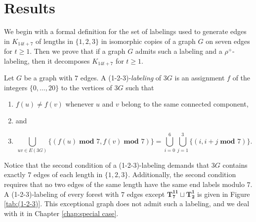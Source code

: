 \section{Results}\label{sec:7,8result}
We begin with a formal definition for the set of labelings used to generate edges in $K_{14t+7}$ of lengths in $\{1,2,3\}$ in isomorphic copies of a graph $G$ on seven edges for $t\geq 1$. Then we prove that if a graph $G$ admits such a labeling and a $\rho^{+}$-labeling, then it decomposes $K_{14t+7}$ for $t\geq 1$.
\begin{definition}\label{def:1-2-3}
    Let $G$ be a graph with $7$ edges. A (1-2-3)-\emph{labeling} of $3G$ is an assignment $f$ of the integers $\{0,\dots,20\}$ to the vertices of $3G$ such that
    \begin{enumerate}
        \item $f(u) \neq f(v)$ whenever $u$ and $v$ belong to the same connected component,
        \item[] and
        \item $$\bigcup_{uv\in E(3G)} \{(f(u)\; \textbf{mod } 7,f(v)\; \textbf{mod } 7)\}= \bigcup_{i=0}^{6} \bigcup_{j=1}^{3} \{(i,i+j \; \textbf{mod } 7)\}.$$
    \end{enumerate}

\end{definition}
Notice that the second condition of a (1-2-3)-labeling demands that $3G$ contains exactly $7$ edges of each length in $\{1,2,3\}$. Additionally, the second condition requires that no two edges of the same length have the same end labels modulo $7$. A (1-2-3)-labeling of every forest with $7$ edges except $\mathbf{T_{7}^{11}}\sqcup\mathbf{T_{2}^{1}}$ is given in Figure \ref{tab:(1-2-3)}. This exceptional graph does not admit such a labeling, and we deal with it in Chapter \ref{chap:special case}. 

